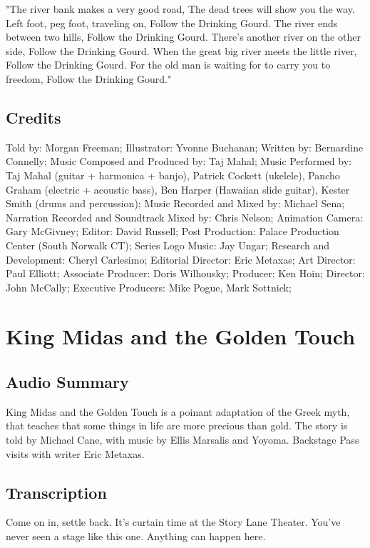"The river bank makes a very good road,
The dead trees will show you the way.
Left foot, peg foot, traveling on,
Follow the Drinking Gourd.
The river ends between two hills,
Follow the Drinking Gourd.
There's another river on the other side,
Follow the Drinking Gourd.
When the great big river meets the little river,
Follow the Drinking Gourd.
For the old man is waiting for to carry you to freedom,
Follow the Drinking Gourd."

\subsection{Credits}

Told by: Morgan Freeman;
Illustrator: Yvonne Buchanan;
Written by: Bernardine Connelly;
Music Composed and Produced by: Taj Mahal;
Music Performed by: Taj Mahal (guitar + harmonica + banjo), Patrick Cockett (ukelele), Pancho Graham (electric + acoustic bass), Ben Harper (Hawaiian slide guitar), Kester Smith (drums and percussion);
Music Recorded and Mixed by: Michael Sena;
Narration Recorded and Soundtrack Mixed by: Chris Nelson;
Animation Camera: Gary McGivney;
Editor: David Russell;
Post Production: Palace Production Center (South Norwalk CT);
Series Logo Music: Jay Ungar;
Research and Development: Cheryl Carlesimo;
Editorial Director: Eric Metaxas;
Art Director: Paul Elliott;
Associate Producer: Doris Wilhousky;
Producer: Ken Hoin;
Director: John McCally;
Executive Producers: Mike Pogue, Mark Sottnick;

\section{King Midas and the Golden Touch}

\subsection{Audio Summary}

King Midas and the Golden Touch is a poinant adaptation of the Greek myth, that teaches that some things in life are more precious than gold. The story is told by Michael Cane, with music by Ellis Marsalis and Yoyoma. Backstage Pass visits with writer Eric Metaxas.

\subsection{Transcription}

Come on in, settle back. It's curtain time at the Story Lane Theater. You've never seen a stage like this one. Anything can happen here.

